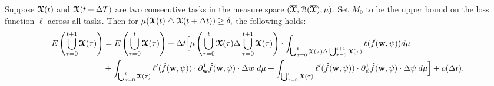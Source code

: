 \begin{lemma}\label{lem:taylor}
    Suppose $\boldsymbol{\mathcal{X}}(t)$ and $\boldsymbol{\mathcal{X}}(t+\Delta T)$ are two consecutive tasks in the measure space $(\overline{\boldsymbol{\mathcal{X}}}, \mathcal{B}(\overline{\boldsymbol{\mathcal{X}}}),\mu).$  Set $M_0$ to be the upper bound on the loss function $\ell$ across all tasks. Then for $\mu(\boldsymbol{\mathcal{X}}(t)\bigtriangleup \boldsymbol{\mathcal{X}}(t+\Delta t))\geq \delta,$ the following holds:
    {\small\begin{align}
        E\left(\bigcup_{\tau = 0}^{t+1}\boldsymbol{\mathcal{X}}(\tau)\right) & = E\left(\bigcup_{\tau = 0}^{t}\boldsymbol{\mathcal{X}}(\tau)\right) + \Delta t\Big[\mu\left( \bigcup_{\tau = 0}^{t}\boldsymbol{\mathcal{X}}(\tau)\Delta \bigcup_{\tau = 0}^{t+1}\boldsymbol{\mathcal{X}}(\tau)\right)\cdot \displaystyle\int_{\bigcup_{\tau = 0}^{t}\boldsymbol{\mathcal{X}}(\tau)\Delta \bigcup_{\tau = 0}^{t+1}\boldsymbol{\mathcal{X}}(\tau)} \ell(\hat{f}(\boldsymbol{\mathrm{w}},\psi))d\mu \nonumber \\
        & + \displaystyle\int_{\bigcup_{\tau = 0}^{t}\boldsymbol{\mathcal{X}}(\tau)} \ell'(\hat{f}(\boldsymbol{\mathrm{w}},\psi))\cdot \partial_{\boldsymbol{\mathrm{w}}}^1 \hat{f}(\boldsymbol{\mathrm{w}},\psi)\cdot \Delta w \hspace{1mm} d\mu \nonumber  +\displaystyle\int_{\bigcup_{\tau = 0}^{t}\boldsymbol{\mathcal{X}}(\tau)} \ell'(\hat{f}(\boldsymbol{\mathrm{w}},\psi))\cdot \partial_\psi^1 \hat{f}(\boldsymbol{\mathrm{w}},\psi)\cdot \Delta \psi \hspace{1mm}  d\mu\Big]+ o(\Delta t).
    \end{align}}
\end{lemma}
